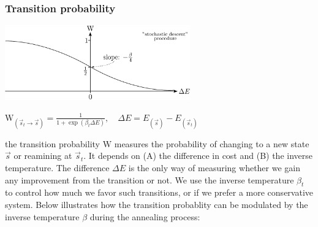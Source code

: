 \begin{frame} \frametitle{Transition probability}
  \begin{center}\includegraphics[width=8cm]{img/section3_fig1}
  \end{center}
  \begin{center}
  \vspace{-0.5cm}
  $\mathrm{W}_{(\vec{s}_t \rightarrow \vec{s})} = \frac{1}{1 + \exp( \beta_t \Delta E)}, \quad \Delta E = E_{(\vec{s})}- E_{(\vec{s}_t)}$\\
  \end{center}
\end{frame}

the transition probability $\mathrm{W}$ measures the probability of changing to a new state $\vec s$ or reamining at $\vec s_t$. It depends on (A) the difference in cost and (B) the inverse temperature. The difference $\Delta E$ is the only way of measuring whether we gain any improvement from the transition or not. We use the inverse temperature $\beta_t$ to control how much we favor such transitions, or if we prefer a more conservative system. Below illustrates how the transition probablity can be modulated by the inverse temperature $\beta$ during the annealing process:

